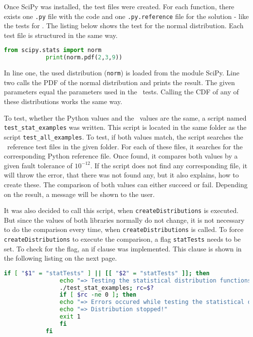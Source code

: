 	Once \ac{SciPy} was installed, the test files were created. For each function, there exists one \lstinline{.py} file with the code and one \lstinline{.py.reference} file for the solution - like the tests for \setlx. The listing below shows the test for the normal distribution. Each test file is structured in the same way.

	\begin{center}
		\begin{lstlisting}[caption={Python Test Example}, language={Python}, label={lis:pythontest}]
			from scipy.stats import norm
			print(norm.pdf(2,3,9))
		\end{lstlisting}
	\end{center}

	In line one, the used distribution (\lstinline{norm}) is loaded from the module \ac{SciPy}. Line two calls the \ac{PDF} of the normal distribution and prints the result. The given parameters equal the parameters used in the \setlx\ tests. Calling the \ac{CDF} of any of these distributions works the same way.

	To test, whether the Python values and the \setlx\ values are the same, a script named \lstinline{test_stat_examples} was written. This script is located in the same folder as the script \lstinline{test_all_examples}. To test, if both values match, the script searches the \setlx\ reference test files in the given folder. For each of these files, it searches for the corresponding Python reference file. Once found, it compares both values by a given fault tolerance of $10^{-12}$. If the script does not find any corresponding file, it will throw the error, that there was not found any, but it also explains, how to create these. The comparison of both values can either succeed or fail. Depending on the result, a message will be shown to the user.

	It was also decided to call this script, when \lstinline{createDistributions} is executed. But since the values of both libraries normally do not change, it is not necessary to do the comparison every time, when \lstinline{createDistributions} is called. To force \lstinline{createDistributions} to execute the comparison, a flag \lstinline{statTests} needs to be set. To check for the flag, an if clause was implemented. This clause is shown in the following listing on the next page.

	
	\begin{minipage}{\linewidth}
		\begin{lstlisting}[caption={Check for statTests flag}, language={bash}, label={lis:stattestsflag}]
			if [ "$1" = "statTests" ] || [[ "$2" = "statTests" ]]; then
			    echo "=> Testing the statistical distribution functions ..."
			    ./test_stat_examples; rc=$?
			    if [ $rc -ne 0 ]; then
				echo "=> Errors occured while testing the statistical distribution functions."
				echo "=> Distribution stopped!"
				exit 1
			    fi
			fi
		\end{lstlisting}
	\end{minipage}
